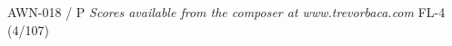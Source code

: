 \documentclass[11pt]{report}
\begin{document}
\null \vfill

AWN-018 / P \hfill
\textit{Scores available from the composer at www.trevorbaca.com}
\hfill FL-4 (4/107)
\end{document}
